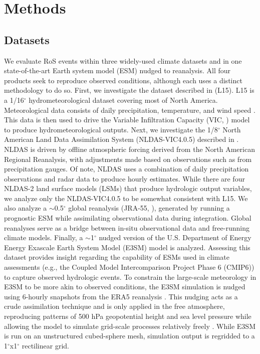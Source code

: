 \documentclass[draft]{agujournal2019}
\newcommand{\degree}{$^{\circ}$}
\begin{document}

\section{Methods}

\subsection{Datasets}

We evaluate RoS events within three widely-used climate datasets and in one state-of-the-art Earth system model (ESM) nudged to reanalysis. All four products seek to reproduce observed conditions, although each uses a distinct methodology to do so. 
First, we investigate the dataset described in \citet{livneh2015spatially} (L15). 
L15 is a 1/16\degree{} hydrometeorological dataset covering most of North America. 
Meteorological data consists of daily precipitation, temperature, and wind speed \citep{henn2018an}. 
This data is then used to drive the Variable Infiltration Capacity (VIC, \citet{liang1994simple}) model to produce hydrometeorological outputs. 
Next, we investigate the 1/8\degree{} North American Land Data Assimilation System (NLDAS-VIC4.0.5)  described in \citet{xia2012continental1}. 
NLDAS is driven by offline atmospheric forcing derived from the North American Regional Reanalysis, with adjustments made based on observations such as from precipitation gauges. 
Of note, NLDAS uses a combination of daily precipitation observations and radar data to produce hourly estimates. 
While there are four NLDAS-2 land surface models (LSMs) that produce hydrologic output variables, we analyze only the NLDAS-VIC4.0.5 to be somewhat consistent with L15.
We also analyze a $\sim$0.5\degree{} global reanalysis (JRA-55, \citet{kobayashi2015jra55}), generated by running a prognostic ESM while assimilating observational data during integration. 
Global reanalyses serve as a bridge between in-situ observational data and free-running climate models. 
Finally, a $\sim$1\degree{} nudged version of the U.S. Department of Energy Energy Exascale Earth System Model (E3SM) model is analyzed. Assessing this dataset provides insight regarding the capability of ESMs used in climate assessments (e.g., the Coupled Model Intercomparison Project Phase 6 (CMIP6)) to capture observed hydrologic events.
To constrain the large-scale meteorology in E3SM to be more akin to observed conditions, the E3SM simulation is nudged using 6-hourly snapshots from the ERA5 reanalysis \citep{herbash2020era5}.
This nudging acts as a crude assimilation technique and is only applied in the free atmosphere, reproducing patterns of 500 hPa geopotential height and sea level pressure while allowing the model to simulate grid-scale processes relatively freely \citep{sun2019impact}. 
While E3SM is run on an unstructured cubed-sphere mesh, simulation output is regridded to a 1\degree{}x1\degree{} rectilinear grid.
\end{document}
